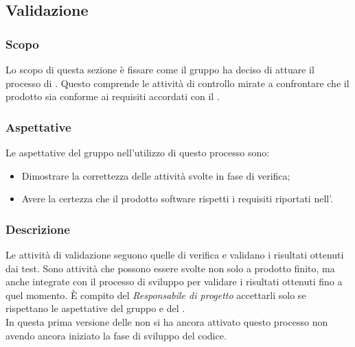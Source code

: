 \subsection{Validazione}
\subsubsection{Scopo}
Lo scopo di questa sezione è fissare come il gruppo ha deciso di attuare il processo di . Questo comprende le attività di controllo mirate a confrontare che il prodotto sia conforme ai requisiti accordati con il .

\subsubsection{Aspettative}
Le aspettative del gruppo \Gruppo{} nell'utilizzo di questo processo sono:
\begin{itemize}
	\item Dimostrare la correttezza delle attività svolte in fase di verifica; 
	\item Avere la certezza che il prodotto software rispetti i requisiti riportati nell'\AdR{}.
\end{itemize}

\subsubsection{Descrizione}
Le attività di validazione seguono quelle di verifica e validano i risultati ottenuti dai test. Sono attività che possono essere svolte non solo a prodotto finito, ma anche integrate con il processo di sviluppo per validare i risultati ottenuti fino a quel momento. È compito del \textit{Responsabile di progetto} accettarli solo se rispettano le aspettative del gruppo e del . \\
\linebreak
In questa prima versione delle \NdP{} non si ha ancora attivato questo processo non avendo ancora iniziato la fase di sviluppo del codice.

